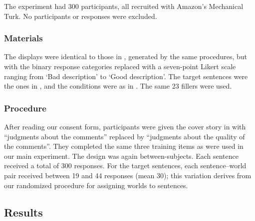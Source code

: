 \documentclass[leqno,12pt]{article}
\begin{document}
\begin{appendix}
The experiment had 300 participants, all recruited with Amazon's
Mechanical Turk. No participants or responses were excluded.

\subsubsection{Materials}

The displays were identical to those in ,
generated by the same procedures, but with the binary response
categories replaced with a seven-point Likert scale ranging from `Bad
description' to `Good description'. The target sentences were the ones
in , and the conditions were as in . The same 23
fillers were used.

\subsubsection{Procedure} 

After reading our consent form, participants were given the cover
story in  with ``judgments about the comments''
replaced by ``judgments about the quality of the comments''. They
completed the same three training items as were used in our main
experiment. The design was again between-subjects.  Each sentence
received a total of 300 responses. For the target sentences, each
sentence--world pair received between 19 and 44 responses (mean 30);
this variation derives from our randomized procedure for assigning
worlds to sentences.


\subsection{Results}


\end{appendix}
\end{document}
